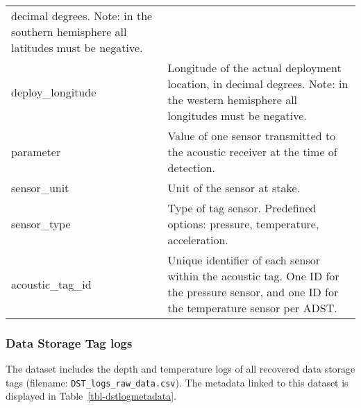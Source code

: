 \documentclass[
  authoryear,
  review,
  3p]{elsarticle}
\begin{document}
\begin{longtable}[]{@{}
  >{\raggedright\arraybackslash}p{}
  >{\raggedright\arraybackslash}p{}@{}}
decimal degrees. Note: in the southern hemisphere all latitudes must be
negative. \\
deploy\_longitude & Longitude of the actual deployment location, in
decimal degrees. Note: in the western hemisphere all longitudes must be
negative. \\
parameter & Value of one sensor transmitted to the acoustic receiver at
the time of detection. \\
sensor\_unit & Unit of the sensor at stake. \\
sensor\_type & Type of tag sensor. Predefined options: pressure,
temperature, acceleration. \\
acoustic\_tag\_id & Unique identifier of each sensor within the acoustic
tag. One ID for the pressure sensor, and one ID for the temperature
sensor per ADST. \\
\end{longtable}

\hypertarget{data-storage-tag-logs}{%
\subsubsection*{Data Storage Tag logs}\label{data-storage-tag-logs}}

The dataset includes the depth and temperature logs of all recovered
data storage tags (filename: \texttt{DST\_logs\_raw\_data.csv}). The
metadata linked to this dataset is displayed in
Table~\ref{tbl-dstlogmetadata}.
\end{document}
